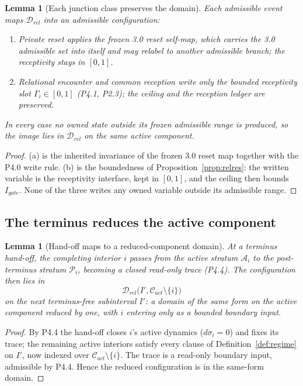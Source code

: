 \documentclass[11pt,a4paper]{article}
\def\mathrm#1{#1}%
\def\emph#1{#1}%
\theoremstyle{definition}
\theoremstyle{plain}
\newtheorem{lemma}[definition]{Lemma}
\theoremstyle{remark}
\begin{document}
\begin{lemma}[Each junction class preserves the domain]\label{lem:junctions}
Each admissible event maps \(\mathcal D_{\mathrm{rel}}\) into an admissible configuration:
\begin{enumerate}[label=\textup{(\alph*)},leftmargin=1.2cm]
\item \emph{Private reset} applies the frozen 3.0 reset self-map, which carries the 3.0
admissible set into itself and may relabel to another admissible branch; the receptivity
stays in \([0,1]\).
\item \emph{Relational encounter} and \emph{common reception} write only the bounded
receptivity slot \(\Gamma_i\in[0,1]\) (P4.1, P2.3); the ceiling and the reception ledger are
preserved.
\end{enumerate}
In every case no owned state outside its frozen admissible range is produced, so the image
lies in \(\mathcal D_{\mathrm{rel}}\) on the same active component.
\end{lemma}

\begin{proof}
(a) is the inherited invariance of the frozen 3.0 reset map together with the P4.0 write
rule. (b) is the boundedness of Proposition~\ref{prop:relres}: the written variable is the
receptivity interface, kept in \([0,1]\), and the ceiling then bounds \(I_{\mathrm{gate}}\).
None of the three writes any owned variable outside its admissible range. \qedhere
\end{proof}

\subsection{The terminus reduces the active component}

\begin{lemma}[Hand-off maps to a reduced-component domain]\label{lem:redhandoff}
At a terminus hand-off, the completing interior \(i\) passes from the active stratum
\(\mathcal A_i\) to the post-terminus stratum \(\mathcal P_i\), becoming a closed read-only
trace (P4.4). The configuration then lies in
\[
\mathcal D_{\mathrm{rel}}\bigl(I',\mathcal C_{\mathrm{act}}\setminus\{i\}\bigr)
\]
on the next terminus-free subinterval \(I'\): a domain of the same form on the active
component reduced by one, with \(i\) entering only as a bounded boundary input.
\end{lemma}

\begin{proof}
By P4.4 the hand-off closes \(i\)'s active dynamics (\(d\sigma_i=0\)) and fixes its trace; the
remaining active interiors satisfy every clause of Definition~\ref{def:regime} on \(I'\),
now indexed over \(\mathcal C_{\mathrm{act}}\setminus\{i\}\). The trace is a read-only
boundary input, admissible by P4.4. Hence the reduced configuration is in the same-form
domain. \qedhere
\end{proof}
\end{document}

